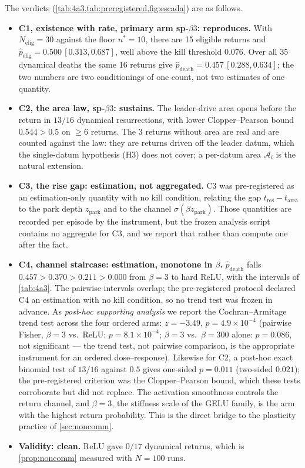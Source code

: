 \documentclass[11pt]{article}
\theoremstyle{definition}
\theoremstyle{remark}
\begin{document}
The verdicts (\cref{tab:4a3,tab:preregistered,fig:escada}) are as follows.

\begin{itemize}
\item \textbf{C1, existence with rate, primary arm sp-$\beta3$: reproduces.}
With $N_{\mathrm{elig}}=30$ against the floor $n^\ast=10$, there are 15 eligible
returns and $\hat p_{\mathrm{elig}}=0.500\,[0.313,0.687]$, well above the kill
threshold $0.076$. Over all 35 dynamical deaths the same 16 returns give
$\hat p_{\mathrm{death}}=0.457\,[0.288,0.634]$; the two numbers are two
conditionings of one count, not two estimates of one quantity.

\item \textbf{C2, the area law, sp-$\beta3$: sustains.} The leader-drive area
opens before the return in $13/16$ dynamical resurrections, with lower
Clopper--Pearson bound $0.544>0.5$ on $\ge6$ returns. The 3 returns without area
are real and are counted against the law: they are returns driven off the
leader datum, which the single-datum hypothesis (H3) does not cover; a
per-datum area $\mathcal A_i$ is the natural extension.

\item \textbf{C3, the rise gap: estimation, not aggregated.} C3 was
pre-registered as an estimation-only quantity with no kill condition, relating
the gap $t_{\mathrm{res}}-t_{\mathrm{area}}$ to the park depth
$z_{\mathrm{park}}$ and to the channel $\sigma(\beta z_{\mathrm{park}})$. Those
quantities are recorded per episode by the instrument, but the frozen analysis
script contains no aggregate for C3, and we report that rather than compute one
after the fact.

\item \textbf{C4, channel staircase: estimation, monotone in $\beta$.}
$\hat p_{\mathrm{death}}$ falls $0.457>0.370>0.211>0.000$ from $\beta=3$ to hard
ReLU, with the intervals of \cref{tab:4a3}. The pairwise intervals overlap;
the pre-registered protocol declared C4 an estimation with no kill condition,
so no trend test was frozen in advance. As \emph{post-hoc supporting analysis}
we report the Cochran--Armitage trend test across the four ordered arms:
$z=-3.49$, $p=4.9\times10^{-4}$ (pairwise Fisher, $\beta=3$ vs.\ ReLU:
$p=8.1\times10^{-4}$; $\beta=3$ vs.\ $\beta=300$ alone: $p=0.086$, not
significant --- the trend test, not pairwise comparison, is the appropriate
instrument for an ordered dose--response). Likewise for C2, a post-hoc exact
binomial test of $13/16$ against $0.5$ gives one-sided $p=0.011$ (two-sided
$0.021$); the pre-registered criterion was the Clopper--Pearson bound, which
these tests corroborate but did not replace. The activation smoothness controls
the return channel, and $\beta=3$, the stiffness scale of the GELU family, is the
arm with the highest return probability. This is the direct bridge to the
plasticity practice of \cref{sec:noncomm}.

\item \textbf{Validity: clean.} ReLU gave $0/17$ dynamical returns, which is
\cref{prop:noncomm} measured with $N=100$ runs.
\end{itemize}
\end{document}
